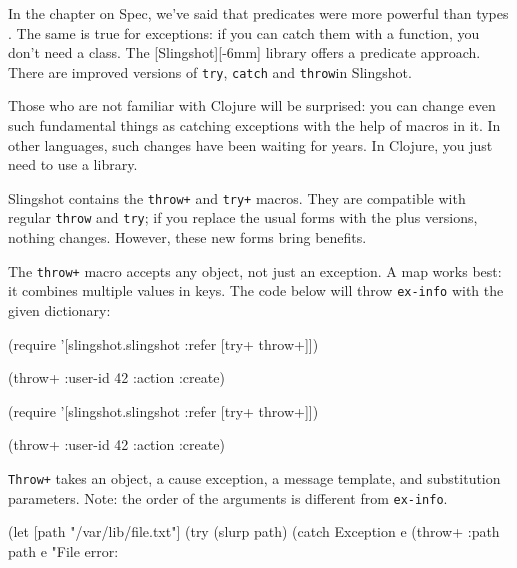 
In the chapter on Spec, we've said that predicates were more powerful than types . The same is true for exceptions: if you can catch them with a function, you don't need a class. The [Slingshot][-6mm] library offers a predicate approach. There are improved versions of \verb|try|, \verb|catch| and \verb|throw|in Slingshot.


Those who are not familiar with Clojure will be surprised: you can change even such fundamental things as catching exceptions with the help of macros in it. In other languages, such changes have been waiting for years. In Clojure, you just need to use a library.


Slingshot contains the \verb|throw+| and \verb|try+| macros. They are compatible with regular \verb|throw| and \verb|try|; if you replace the usual forms with the plus versions, nothing changes. However, these new forms bring benefits.

The \verb|throw+| macro accepts any object, not just an exception. A map works best: it combines multiple values in keys. The code below will throw \verb|ex-info| with the given dictionary:

\ifx\DEVICETYPE\MOBILE

\begin{clojure}
(require
  '[slingshot.slingshot
    :refer [try+ throw+]])

(throw+ {:user-id 42 :action :create})
\end{clojure}

\else

\begin{clojure}
(require '[slingshot.slingshot :refer [try+ throw+]])

(throw+ {:user-id 42 :action :create})
\end{clojure}

\fi

\verb|Throw+| takes an object, a cause exception, a message template, and substitution parameters. Note: the order of the arguments is different from \verb|ex-info|.

\ifx\DEVICETYPE\MOBILE

\begin{clojure}
(let [path "/var/lib/file.txt"]
  (try
    (slurp path)
    (catch Exception e
      (throw+ {:path path} e
      "File error: %
\end{clojure}

